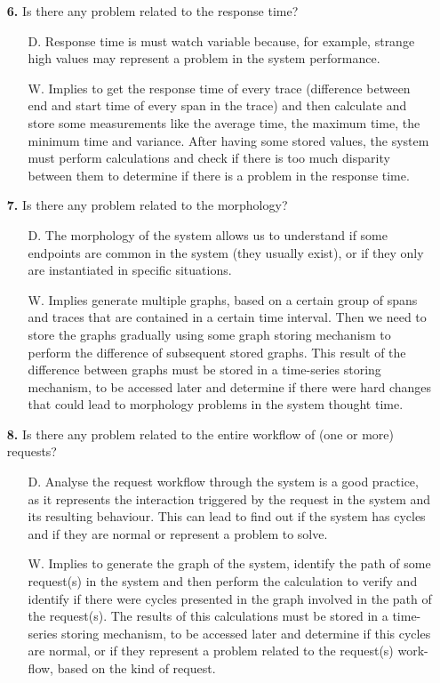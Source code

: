 \begin{enumerate}
\begin{itemize}
    \item[\textbf{6.}] Is there any problem related to the response time?
    \begin{itemize}
        \item[D.] Response time is must watch variable because, for example, strange high values may represent a problem in the system performance.
        \item[W.] Implies to get the response time of every trace (difference between end and start time of every span in the trace) and then calculate and store some measurements like the average time, the maximum time, the minimum time and variance. After having some stored values, the system must perform calculations and check if there is too much disparity between them to determine if there is a problem in the response time.
    \end{itemize}

    \item[\textbf{7.}] Is there any problem related to the morphology?
    \begin{itemize}
        \item[D.] The morphology of the system allows us to understand if some endpoints are common in the system (they usually exist), or if they only are instantiated in specific situations.
        \item[W.] Implies generate multiple graphs, based on a certain group of spans and traces that are contained in a certain time interval. Then we need to store the graphs gradually using some graph storing mechanism to perform the difference of subsequent stored graphs. This result of the difference between graphs must be stored in a time-series storing mechanism, to be accessed later and determine if there were hard changes that could lead to morphology problems in the system thought time.
    \end{itemize}
    
    \item[\textbf{8.}] Is there any problem related to the entire workflow of (one or more) requests?
    \begin{itemize}
        \item[D.] Analyse the request workflow through the system is a good practice, as it represents the interaction triggered by the request in the system and its resulting behaviour. This can lead to find out if the system has cycles and if they are normal or represent a problem to solve.  
        \item[W.] Implies to generate the graph of the system, identify the path of some request(s) in the system and then perform the calculation to verify and identify if there were cycles presented in the graph involved in the path of the request(s). The results of this calculations must be stored in a time-series storing mechanism, to be accessed later and determine if this cycles are normal, or if they represent a problem related to the request(s) work-flow, based on the kind of request.
    \end{itemize}


\end{itemize}
\end{enumerate}
